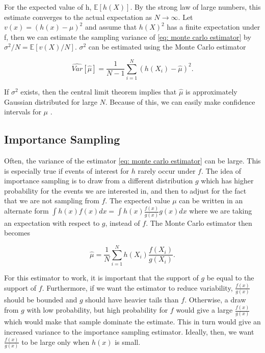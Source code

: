For the expected value of h, $\mathbb{E}[h(X)]$. By the strong law of large numbers, this estimate converges to the actual expectation as $N\rightarrow\infty$. Let $v(x) = (h(x) - {\mu})^2$ and assume that $h(X)^2$ has a finite expectation under f, then we can estimate the sampling variance of \eqref{eq: monte carlo estimator} by $\sigma^2/N = \mathbb{E}[v(X)/N]$. $\sigma^2$ can be estimated using the Monte Carlo estimator

\begin{equation}
    \widehat{Var}[\hat{\mu}] = \frac{1}{N-1}\sum_{i=1}^N (h(X_i) - \hat{\mu})^2.
\end{equation}

If $\sigma^2$ exists, then the central limit theorem implies that $\hat{\mu}$ is approximately Gaussian distributed for large $N$. Because of this, we can easily make confidence intervals for $\mu$ \parencite{givens2013computational}.


\subsection{Importance Sampling}
\label{subsec: importance sampling theory}
Often, the variance of the estimator \eqref{eq: monte carlo estimator} can be large. This is especially true if events of interest for $h$ rarely occur under $f$. The idea of importance sampling is to draw from a different distribution $g$ which has higher probability for the events we are interested in, and then to adjust for the fact that we are not sampling from $f$. The expected value $\mu$ can be written in an alternate form $\int h(x)f(x)dx = \int h(x)\frac{f(x)}{g(x)}g(x) dx$ where we are taking an expectation with respect to $g$, instead of $f$. The Monte Carlo estimator then becomes

\begin{equation}
    \hat{\mu} = \frac{1}{N} \sum_{i=1}^N h(X_i)\frac{f(X_i)}{g(X_i)}.
\end{equation}

For this estimator to work, it is important that the support of $g$ be equal to the support of $f$. Furthermore, if we want the estimator to reduce variability, $\frac{f(x)}{g(x)}$ should be bounded and $g$ should have heavier tails than $f$. Otherwise, a draw from $g$ with low probability, but high probability for $f$ would give a large $\frac{f(x)}{g(x)}$ which would make that sample dominate the estimate. This in turn would give an increased variance to the importance sampling estimator. Ideally, then, we want $\frac{f(x)}{g(x)}$ to be large only when $h(x)$ is small. \parencite{givens2013computational}






